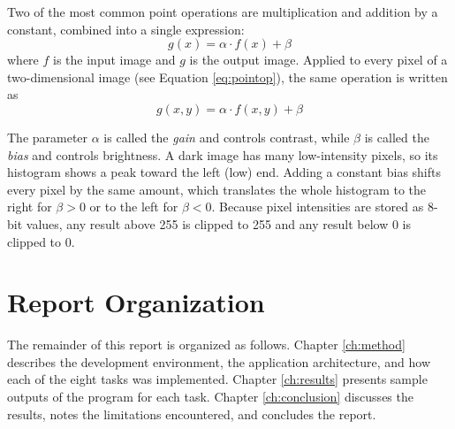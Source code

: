 Two of the most common point operations are multiplication and
addition by a constant, combined into a single expression:
\begin{equation}
  g(x) = \alpha \cdot f(x) + \beta
  \label{eq:pointop-1d}
\end{equation}
where $f$ is the input image and $g$ is the output image. Applied to
every pixel of a two-dimensional image (see Equation
\ref{eq:pointop}), the same operation is written as
\begin{equation}
  g(x,y) = \alpha \cdot f(x,y) + \beta
  \label{eq:pointop}
\end{equation}

The parameter $\alpha$ is called the \emph{gain} and controls
contrast, while $\beta$ is called the \emph{bias} and controls
brightness. A dark image has many low-intensity pixels, so its
histogram shows a peak toward the left (low) end. Adding a constant
bias shifts every pixel by the same amount, which translates the
whole histogram to the right for $\beta > 0$ or to the left for
$\beta < 0$. Because pixel intensities are stored as 8-bit values,
any result above 255 is clipped to 255 and any result below 0 is
clipped to 0.


\section{Report Organization}
\label{sec:organization}

The remainder of this report is organized as follows. Chapter
\ref{ch:method} describes the development environment, the
application architecture, and how each of the eight tasks was
implemented. Chapter \ref{ch:results} presents sample outputs of the
program for each task. Chapter \ref{ch:conclusion} discusses the
results, notes the limitations encountered, and concludes the report.
